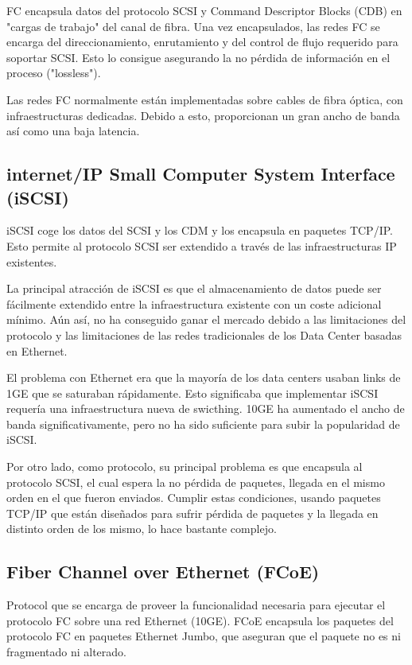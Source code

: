 FC encapsula datos del protocolo SCSI y Command Descriptor Blocks (CDB) en "cargas de trabajo" del canal de fibra. Una vez encapsulados, las redes FC se encarga del direccionamiento, enrutamiento y del control de flujo requerido para soportar SCSI. Esto lo consigue asegurando la no pérdida de información en el proceso ("lossless").

Las redes FC normalmente están implementadas sobre cables de fibra óptica, con infraestructuras dedicadas. Debido a esto, proporcionan un gran ancho de banda así como una baja latencia.

\subsection{internet/IP Small Computer System Interface (iSCSI)}

iSCSI coge los datos del SCSI y los CDM y los encapsula en paquetes TCP/IP. Esto permite al protocolo SCSI ser extendido a través de las infraestructuras IP existentes.

La principal atracción de iSCSI es que el almacenamiento de datos puede ser fácilmente extendido entre la infraestructura existente con un coste adicional mínimo. Aún así, no ha conseguido ganar el mercado debido a las limitaciones del protocolo y las limitaciones de las redes tradicionales de los Data Center basadas en Ethernet.

El problema con Ethernet era que la mayoría de los data centers usaban links de 1GE que se saturaban rápidamente. Esto significaba que implementar iSCSI requería una infraestructura nueva de swicthing. 10GE ha aumentado el ancho de banda significativamente, pero no ha sido suficiente para subir la popularidad de iSCSI.

Por otro lado, como protocolo, su principal problema es que encapsula al protocolo SCSI, el cual espera la no pérdida de paquetes, llegada en el mismo orden en el que fueron enviados. Cumplir estas condiciones, usando paquetes TCP/IP que están diseñados para sufrir pérdida de paquetes y la llegada en distinto orden de los mismo, lo hace bastante complejo.

\subsection{Fiber Channel over Ethernet (FCoE)}

Protocol que se encarga de proveer la funcionalidad necesaria para ejecutar el protocolo FC sobre una red Ethernet (10GE). FCoE encapsula los paquetes del protocolo FC en paquetes Ethernet Jumbo, que aseguran que el paquete no es ni fragmentado ni alterado.


